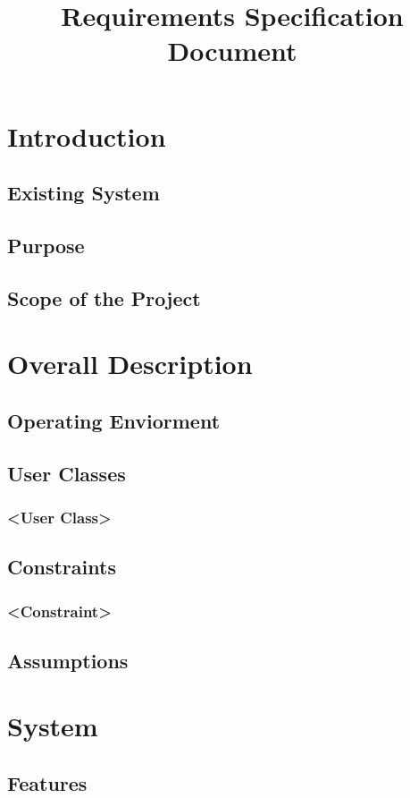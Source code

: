 \documentclass{article}
\title{Requirements Specification Document}
\begin{document}
\maketitle
\newpage
\tableofcontents
\newpage
\section{Introduction}
    \subsection{Existing System}
    \subsection{Purpose}
	\subsection{Scope of the Project}
\section{Overall Description}
    \subsection{Operating Enviorment}
    \subsection{User Classes}
        \subsubsection{<User Class>}
    \subsection{Constraints}
        \subsubsection{<Constraint>}
    \subsection{Assumptions}
\section{System}
    \subsection{Features}
\end{document}

